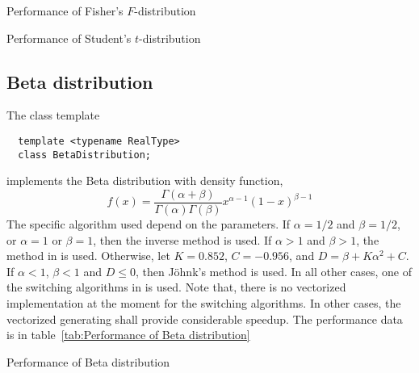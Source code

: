 \begin{table}
  \caption{Performance of Fisher's $F$-distribution}
  \label{tab:Performance of Fisher's F-distribution}
\end{table}

\begin{table}
  \caption{Performance of Student's $t$-distribution}
  \label{tab:Performance of Student's t-distribution}
\end{table}

\subsection{Beta distribution}
\label{sub:Beta distribution}

The class template
\begin{Verbatim}
  template <typename RealType>
  class BetaDistribution;
\end{Verbatim}
implements the Beta distribution with density function,
\begin{equation*}
  f(x) = \frac{\Gamma(\alpha + \beta)}{\Gamma(\alpha)\Gamma(\beta)}
  x^{\alpha - 1}(1 - x)^{\beta - 1}
\end{equation*}
The specific algorithm used depend on the parameters. If $\alpha = 1/2$ and
$\beta = 1/2$, or $\alpha = 1$ or $\beta = 1$, then the inverse method is used.
If $\alpha > 1$ and $\beta > 1$, the method in \textcite{Cheng:1978jl} is used.
Otherwise, let $K = 0.852$, $C = -0.956$, and $D = \beta + K\alpha^2 + C$. If
$\alpha < 1$, $\beta < 1$ and $D \le 0$, then Jöhnk's method
\parencite[sec.~3.5]{Devroye:1986gi} is used. In all other cases, one of the
switching algorithms in \textcite{Atkinson:1979es} is used. Note that, there is
no vectorized implementation at the moment for the switching algorithms. In
other cases, the vectorized generating shall provide considerable speedup. The
performance data is in table~\ref{tab:Performance of Beta distribution}

\begin{table}
  \caption{Performance of Beta distribution}
  \label{tab:Performance of Beta distribution}
\end{table}
